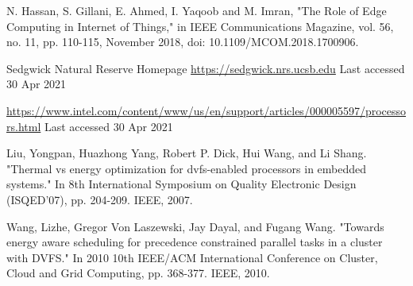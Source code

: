 \documentclass[runningheads]{llncs}
\begin{document}
\begin{thebibliography}{8}

N. Hassan, S. Gillani, E. Ahmed, I. Yaqoob and M. Imran, "The Role of Edge Computing in Internet of Things," in IEEE Communications Magazine, vol. 56, no. 11, pp. 110-115, November 2018, doi: 10.1109/MCOM.2018.1700906.





Sedgwick Natural Reserve Homepage \url{https://sedgwick.nrs.ucsb.edu} Last accessed 30 Apr 2021

\url{https://www.intel.com/content/www/us/en/support/articles/000005597/processors.html} Last accessed 30 Apr 2021 


Liu, Yongpan, Huazhong Yang, Robert P. Dick, Hui Wang, and Li Shang. "Thermal vs energy optimization for dvfs-enabled processors in embedded systems." In 8th International Symposium on Quality Electronic Design (ISQED'07), pp. 204-209. IEEE, 2007.


Wang, Lizhe, Gregor Von Laszewski, Jay Dayal, and Fugang Wang. "Towards energy aware scheduling for precedence constrained parallel tasks in a cluster with DVFS." In 2010 10th IEEE/ACM International Conference on Cluster, Cloud and Grid Computing, pp. 368-377. IEEE, 2010.




\end{thebibliography}
\end{document}
